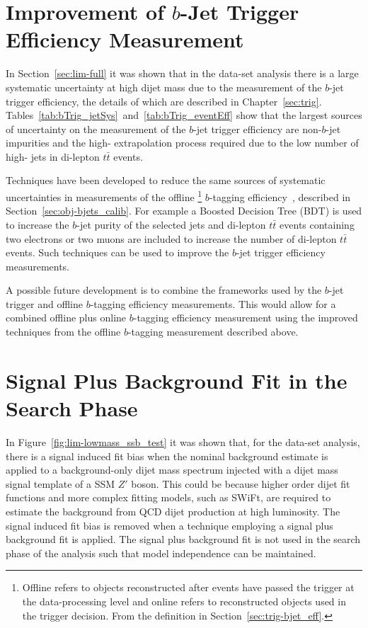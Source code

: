 \section{Improvement of $b$-Jet Trigger Efficiency Measurement}

In Section~\ref{sec:lim-full} it was shown that in the \lm{} data-set analysis there
is a large systematic uncertainty at high dijet mass due to the 
measurement of the $b$-jet trigger efficiency, the details of which are described in Chapter~\ref{sec:trig}.
Tables~\ref{tab:bTrig_jetSys}~and~\ref{tab:bTrig_eventEff} show that the largest sources of uncertainty
on the measurement of the $b$-jet trigger efficiency are non-$b$-jet impurities
and the high-\pT{} extrapolation process required due to the low number of high-\pT{} jets in di-lepton $t\bar{t}$ events.

Techniques have been developed to reduce the same sources of systematic uncertainties in
measurements of the offline \footnote{Offline refers to objects reconstructed after events have passed the trigger at the data-processing level
  and online refers to reconstructed objects used in the trigger decision.
  From the definition in Section~\ref{sec:trig-bjet_eff}.}
$b$-tagging efficiency~\cite{obj-bjets_calib_tech,obj-bjets_calib_plots}, described in Section~\ref{sec:obj-bjets_calib}.
For example a Boosted Decision Tree (BDT) is used to increase the $b$-jet purity of the selected jets
and di-lepton $t\bar{t}$ events containing two electrons or two muons are included to increase the number of di-lepton $t\bar{t}$ events.
Such techniques can be used to improve the $b$-jet trigger efficiency measurements.

A possible future development is to combine the frameworks used by the
$b$-jet trigger and offline $b$-tagging efficiency measurements.
This would allow for a combined offline plus online $b$-tagging efficiency measurement using
the improved techniques from the offline $b$-tagging measurement described above.

\section{Signal Plus Background Fit in the Search Phase}

In Figure~\ref{fig:lim-lowmass_ssb_test} it was shown that, for the \lm{} data-set analysis,
there is a signal induced fit bias when the nominal background estimate is applied to a
background-only dijet mass spectrum injected with a dijet mass signal template of a SSM $Z'$ boson.
This could be because higher order dijet fit functions
and more complex fitting models, such as SWiFt, are required to estimate the background from QCD dijet production at high luminosity.
The signal induced fit bias is removed when a technique employing a signal plus background fit is applied.
The signal plus background fit is not used in the search phase of the \lm{} analysis such that model independence can be maintained.

